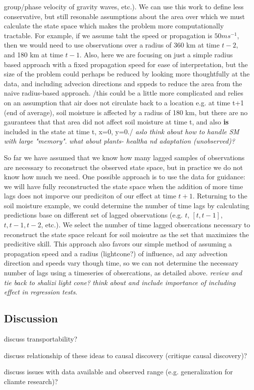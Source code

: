 \documentclass[12pt]{article}
\begin{document}
group/phase velocity of gravity waves, etc.). We can use this work
to define less conservative, but still resonable assumptions about
the area over which we must calculate the state space which makes
the problem more computationally tractable.  For example, if we
assume taht the speed or propagation is \(50 m s^{-1}\), then we
would need to use observations over a radius of 360 km at time
\(t-2\), and 180 km at time \(t-1\). Also, here we are focusing on
just a simple radius based approach with a fixed propagation speed
for ease of interpretation, but the size of the problem could
perhaps be reduced by looking more thoughtfully at the data, and
including advecion directions and sppeds to reduce the area from
the naive radius-based approach. /this could be a little more
complicated and relies on an assumption that air does not
circulate back to a location e.g. at time t+1 (end of average),
soil moisture is affected by a radius of 180 km, but there are no
gaurantees that that area did not affect soil moisture at time t,
and also \textbf{is} included in the state at time t, x=0, y=0./ \emph{aslo
think about how to handle SM with large "memory"}. \emph{what about
plants- healtha nd adaptation (unobserved)?}

So far we have assumed that we know how many lagged samples of
observations are necessary to reconstruct the observed state
space, but in practice we do not know how much we need. One
possible approach is to use the data for guidance: we will have
fully reconstructed the state space when the addition of
more time lags does not imporve our prediciton of our effect at
time \(t+1\). Returning to the soil moisture example, we could
determine the number of time lags by calculating predictions base
on different set of lagged observations (e.g. \({t}\), \([t, t-1]\),
\({t, t-1, t-2}\), etc.). We select the number of time lagged
obsercations necessary to reconstruct the state space relcant for
soil moisutre as the set that maximizes the predicitive
skill. This approach also favors our simple method of assuming a
propagation speed and a radius (lightcone?) of influence, ad any
advection direction and speeds vary though time, so we can not
determine the necessary number of lags using a timeseries of
obsercations, as detailed above. \emph{review and tie back to shalizi
light cone?} \emph{think about and include importance of including
effect in regression tests}.

\subsection{Discussion}

discuss transportability?

discuss relationship of these ideas to causal discovery (critique
causal discovery)?

discuss issues with data available and observed range
(e.g. generalization for cliamte research)?
\end{document}
